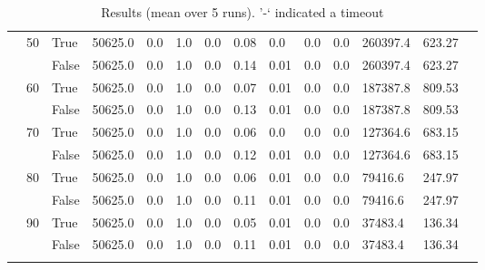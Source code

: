 \begin{appendices}
\begin{landscape}
\begin{small}
\begin{longtable}[c]{@{}lll|ll|ll|ll|ll|lll@{}}
   & 50 & True  & 50625.0         & 0.0            & 1.0           & 0.0           & 0.08          & 0.0           & 0.0           & 0.0           & 260397.4      & 623.27      &  \\
   &    & False & 50625.0         & 0.0            & 1.0           & 0.0           & 0.14          & 0.01          & 0.0           & 0.0           & 260397.4      & 623.27      &  \\
   & 60 & True  & 50625.0         & 0.0            & 1.0           & 0.0           & 0.07          & 0.01          & 0.0           & 0.0           & 187387.8      & 809.53      &  \\
   &    & False & 50625.0         & 0.0            & 1.0           & 0.0           & 0.13          & 0.01          & 0.0           & 0.0           & 187387.8      & 809.53      &  \\
   & 70 & True  & 50625.0         & 0.0            & 1.0           & 0.0           & 0.06          & 0.0           & 0.0           & 0.0           & 127364.6      & 683.15      &  \\
   &    & False & 50625.0         & 0.0            & 1.0           & 0.0           & 0.12          & 0.01          & 0.0           & 0.0           & 127364.6      & 683.15      &  \\
   & 80 & True  & 50625.0         & 0.0            & 1.0           & 0.0           & 0.06          & 0.01          & 0.0           & 0.0           & 79416.6       & 247.97      &  \\
   &    & False & 50625.0         & 0.0            & 1.0           & 0.0           & 0.11          & 0.01          & 0.0           & 0.0           & 79416.6       & 247.97      &  \\
   & 90 & True  & 50625.0         & 0.0            & 1.0           & 0.0           & 0.05          & 0.01          & 0.0           & 0.0           & 37483.4       & 136.34      &  \\
   &    & False & 50625.0         & 0.0            & 1.0           & 0.0           & 0.11          & 0.01          & 0.0           & 0.0           & 37483.4       & 136.34      &  \\* \bottomrule
\caption{Results (mean over 5 runs). '-` indicated a timeout}
\label{lab_res}\\
\end{longtable}
\end{small}
\end{landscape}

\restoregeometry
\end{appendices}